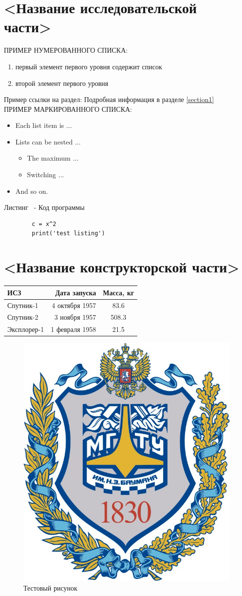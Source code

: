 \documentclass[utf8x, 14pt, oneside, a4paper]{article}
\newcounter{numberlisting}
\begin{document}
		\pagebreak

	\section{<Название исследовательской части>}
	ПРИМЕР НУМЕРОВАННОГО СПИСКА:
	\begin{enumerate} 
  		\item первый элемент первого уровня содержит список 
		\item  второй элемент первого уровня
	\end{enumerate}
	Пример ссылки на раздел: Подробная информация в разделе \ref{section1}
	\\ ПРИМЕР МАРКИРОВАННОГО СПИСКА:
	\begin{itemize}
		\item Each list item is ...
		\item Lists can be nested ...
			\begin{itemize}
				\item The maximum ...
				\item Switching ...
			\end{itemize}
		\item And so on.
	\end{itemize}
	
	Листинг \thenumberlisting \ - Код программы
	\begin{lstlisting}
		c = x^2
		print('test listing')
	\end{lstlisting}
		\pagebreak

	\section{<Название конструкторской части>}
	\begin{tabular}{ | p{100pt} | r | c | }
		\hline
		ИСЗ & Дата запуска & Масса, кг  \\ \hline
		Спутник-1 & 4 октября 1957 & 83.6 \\
		Спутник-2 & 3 ноября 1957 & 508.3 \\
		Эксплорер-1 & 1 февраля 1958 & 21.5 \\
		\hline
	\end{tabular}

	\begin{figure}[h]
		\centering
		\includegraphics[width=0.5\linewidth]{1.png}
		\caption{Тестовый рисунок}
		\label{fig:mpr}
	\end{figure}
	
\end{document}
